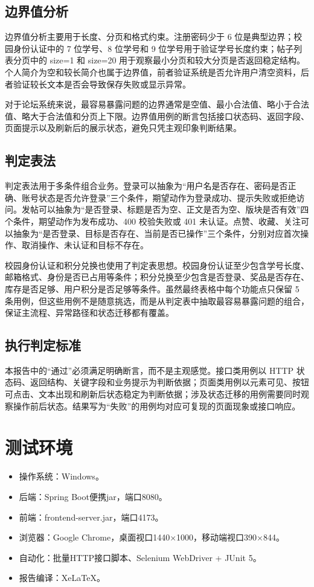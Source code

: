 \documentclass[bwprint]{report}
\begin{document}
\subsection{边界值分析}
边界值分析主要用于长度、分页和格式约束。注册密码少于 6 位是典型边界；校园身份认证中的 7 位学号、8 位学号和 9 位学号用于验证学号长度约束；帖子列表分页中的 size=1 和 size=20 用于观察最小分页和较大分页是否返回稳定结构。个人简介为空和较长简介也属于边界值，前者验证系统是否允许用户清空资料，后者验证较长文本是否会导致保存失败或显示异常。

对于论坛系统来说，最容易暴露问题的边界通常是空值、最小合法值、略小于合法值、略大于合法值和分页上下限。边界值用例的断言包括接口状态码、返回字段、页面提示以及刷新后的展示状态，避免只凭主观印象判断结果。

\subsection{判定表法}
判定表法用于多条件组合业务。登录可以抽象为“用户名是否存在、密码是否正确、账号状态是否允许登录”三个条件，期望动作为登录成功、提示失败或拒绝访问。发帖可以抽象为“是否登录、标题是否为空、正文是否为空、版块是否有效”四个条件，期望动作为发布成功、400 校验失败或 401 未认证。点赞、收藏、关注可以抽象为“是否登录、目标是否存在、当前是否已操作”三个条件，分别对应首次操作、取消操作、未认证和目标不存在。

校园身份认证和积分兑换也使用了判定表思想。校园身份认证至少包含学号长度、邮箱格式、身份是否已占用等条件；积分兑换至少包含是否登录、奖品是否存在、库存是否足够、用户积分是否足够等条件。虽然最终表格中每个功能点只保留 5 条用例，但这些用例不是随意挑选，而是从判定表中抽取最容易暴露问题的组合，保证主流程、异常路径和状态迁移都有覆盖。

\subsection{执行判定标准}
本报告中的“通过”必须满足明确断言，而不是主观感觉。接口类用例以 HTTP 状态码、返回结构、关键字段和业务提示为判断依据；页面类用例以元素可见、按钮可点击、文本出现和刷新后状态稳定为判断依据；涉及状态迁移的用例需要同时观察操作前后状态。结果写为“失败”的用例均对应可复现的页面现象或接口响应。

\section{测试环境}
\begin{itemize}
\item 操作系统：Windows。
\item 后端：Spring Boot便携jar，端口8080。
\item 前端：frontend-server.jar，端口4173。
\item 浏览器：Google Chrome，桌面视口1440×1000，移动端视口390×844。
\item 自动化：批量HTTP接口脚本、Selenium WebDriver + JUnit 5。
\item 报告编译：XeLaTeX。
\end{itemize}
\end{document}
